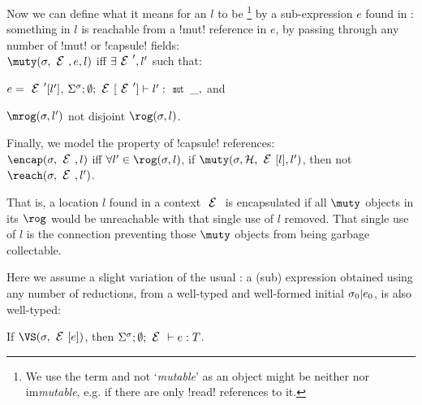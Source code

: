 \noindent Now we can define what it means for an $l$ to be \muty\footnote{We use the term \muty and not `\emph{mutable}' as an object might be neither \muty nor im\emph{mutable}, e.g. if there are only \Q!read! references to it.} by a sub-expression $e$ found in \E: something in $l$ is reachable from a \Q!mut! reference in $e$, by passing through any number of \Q!mut! or \Q!capsule! fields:\\
\indent $\muty(\s, \E, e, l)$ iff $\exists \E',l'$ such that:
\begin{iitemize}
	\item $e = \E'[l']$, $\tyr[\E']{l'}{\Kw{mut}\,\_,}$ and
	\item $\mrog(\s, l')$ not disjoint $\rog(\s, l)$.
\end{iitemize}

\noindent Finally, we model the \encap property of \Q!capsule! references:\\
\indent $\encap(\s, \E, l)$ iff $\forall l' \in \rog(\s, l)$, if $\muty(\s, \h, \E[l], l')$, then 
not $\reach(\s, \E, l')$.

That is, a location $l$ found in a context $\E$ is encapsulated if all $\muty$ objects in its $\rog$ would be unreachable with that single use of $l$ removed.
That single use of $l$ is the connection preventing those $\muty$ objects from being garbage collectable.

Here we assume a slight variation of the usual : a (sub) expression obtained using any number of reductions, from a well-typed and well-formed initial $\sigma_0|e_0$, is also well-typed:
\SS\begin{Assumption}\rm
	If $\VS(\s, \E[e])$, then $\Ss; \emptyset; \E \vdash e : T$.
\end{Assumption}


